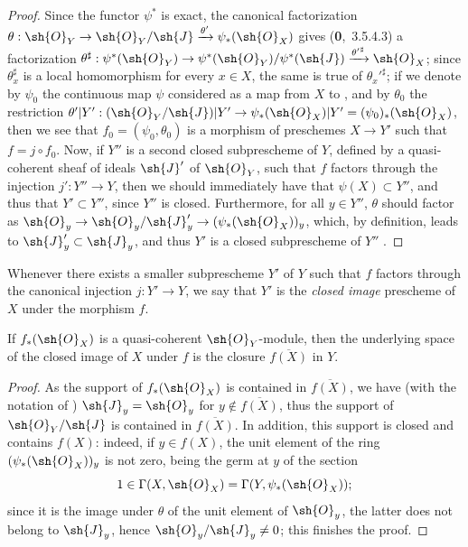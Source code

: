 \begin{proof}
Since the functor $\psi^*$ is exact, the canonical factorization
$\theta:\sh{O}_Y\to\sh{O}_Y/\sh{J}\xrightarrow{\theta'}\psi_*(\sh{O}_X)$ gives (\textbf{0},~3.5.4.3)
a factorization
$\theta^\sharp:\psi^*(\sh{O}_Y)\to\psi^*(\sh{O}_Y)/\psi^*(\sh{J})
  \xrightarrow{{\theta'}^\sharp}\sh{O}_X$; since $\theta_x^\sharp$ is a local homomorphism for
every $x\in X$, the same is true of ${\theta_x'}^\sharp$; if we denote by $\psi_0$ the
continuous map $\psi$ considered as a map from $X$ to , and by $\theta_0$ the restriction
$\theta'|Y':(\sh{O}_Y/\sh{J})|Y'\to\psi_*(\sh{O}_X)|Y'=(\psi_0)_*(\sh{O}_X)$, then we see that
$f_0=(\psi_0,\theta_0)$ is a morphism of preschemes $X\to Y'$  such that
$f=j\circ f_0$. Now, if $Y''$ is
a second closed subprescheme of $Y$, defined by a quasi-coherent sheaf of ideals $\sh{J}'$ of
$\sh{O}_Y$, such that $f$ factors through the injection $j':Y''\to Y$, then we should
immediately have that $\psi(X)\subset Y''$, and thus that $Y'\subset Y''$, since $Y''$ is closed.
Furthermore, for all $y\in Y''$, $\theta$ should factor as
$\sh{O}_y\to\sh{O}_y/\sh{J}'_y\to(\psi_*(\sh{O}_X))_y$, which, by definition, leads to
$\sh{J}'_y\subset\sh{J}_y$, and thus $Y'$ is a closed subprescheme of $Y''$
.
\end{proof}

\begin{definition}[9.5.3]
\label{I.9.5.3}
Whenever there exists a smaller subprescheme $Y'$ of $Y$ such that $f$ factors
through the canonical injection $j:Y'\to Y$, we say that $Y'$ is the
\emph{closed image} prescheme of $X$ under the morphism $f$.
\end{definition}

\begin{proposition}[9.5.4]
\label{I.9.5.4}
If $f_*(\sh{O}_X)$ is a quasi-coherent $\sh{O}_Y$-module, then the underlying space of
the closed image of $X$ under $f$ is the closure $\overline{f(X)}$ in $Y$.
\end{proposition}

\begin{proof}
As the support of $f_*(\sh{O}_X)$ is contained in $\overline{f(X)}$, we have (with
the notation of ) $\sh{J}_y=\sh{O}_y$ for
$y\not\in\overline{f(X)}$, thus the support of $\sh{O}_Y/\sh{J}$ is contained in
$\overline{f(X)}$. In addition, this support is closed and contains $f(X)$:
indeed, if $y\in f(X)$, the unit element of the ring $(\psi_*(\sh{O}_X))_y$ is not
zero, being the germ at $y$ of the section
\[
  1\in\Gamma(X,\sh{O}_X)=\Gamma(Y,\psi_*(\sh{O}_X));
\]
since it is the image under $\theta$ of the unit element of $\sh{O}_y$, the latter
does not belong to $\sh{J}_y$, hence $\sh{O}_y/\sh{J}_y\neq 0$; this finishes the
proof.
\end{proof}

